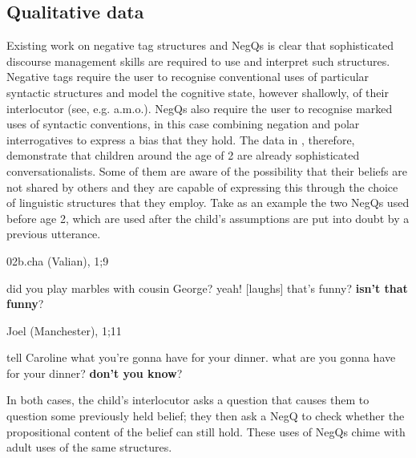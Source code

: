 \documentclass[output=paper,colorlinks,citecolor=brown]{langscibook}
\begin{document}
\subsection{Qualitative data}\label{sect:qualdata}

Existing work on negative tag structures and NegQs is clear that sophisticated discourse management skills are required to use and interpret such structures. Negative tags require the user to recognise conventional uses of particular syntactic structures and model the cognitive state, however shallowly, of their interlocutor (see, e.g. \citealt{sadock1974, ladd1981, asherreese2007, reeseasher2008, malsteph2015} a.m.o.). NegQs also require the user to recognise marked uses of syntactic conventions, in this case combining negation and polar interrogatives to express a bias that they hold. The data in , therefore, demonstrate that children around the age of 2 are already sophisticated conversationalists. Some of them are aware of the possibility that their beliefs are not shared by others and they are capable of expressing this through the choice of linguistic structures that they employ. Take as an example the two NegQs used before age 2, which are used after the child's assumptions are put into doubt by a previous utterance. 

\begin{exe}
\ex 02b.cha (Valian), 1;9 \label{3:funny}
\begin{xlist}
 	did you play marbles with cousin George?
  yeah! [laughs]
  that's funny?  
  \textbf{isn't that funny}?
\end{xlist}
\end{exe}

\begin{exe}
\ex Joel (Manchester), 1;11 \label{3:dinner}
\begin{xlist}
  tell Caroline what you're gonna have for your dinner.
   what are you gonna have for your dinner?  
   \textbf{don't you know}?
\end{xlist}
\end{exe}

In both cases, the child's interlocutor asks a question that causes them to question some previously held belief; they then ask a NegQ to check whether the propositional content of the belief can still hold. These uses of NegQs chime with adult uses of the same structures.
\end{document}
